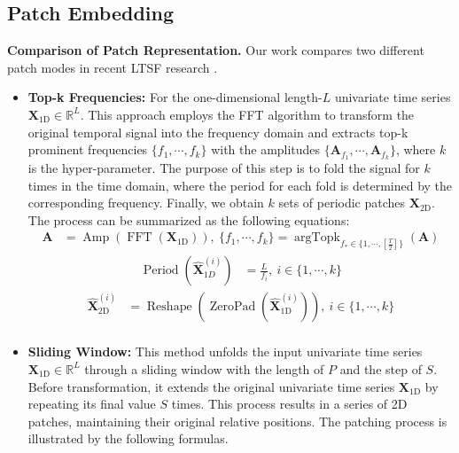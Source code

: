 \documentclass{article} \usepackage{iclr2024_conference,times}
\begin{document}
\subsection{Patch Embedding}

\noindent \textbf{Comparison of Patch Representation.} Our work compares two different patch modes in recent LTSF research \citep{timesnet, patchtst}. 

\noindent\begin{itemize}
\item{\textbf{Top-k Frequencies:}} For the one-dimensional length-$L$ univariate time series $\mathbf{X}_{\text{1D}} \in\mathbb{R}^{L}$. This approach employs the FFT algorithm to transform the original temporal signal into the frequency domain and extracts top-k prominent frequencies $\{f_{1},\cdots,f_{k}\}$ with the amplitudes $\{\mathbf{A}_{f_{1}},\cdots,\mathbf{A}_{f_{k}}\}$, where $k$ is the hyper-parameter. The purpose of this step is to fold the signal for $k$ times in the time domain, where the period for each fold is determined by the corresponding frequency. Finally, we obtain $k$ sets of periodic patches $\mathbf{X}_{\text{2D}}$. The process can be summarized as the following equations: 
\begin{equation}\label{equ:fft_for_period}
  \begin{split}
    \mathbf{A} & = \operatorname{Amp}(\operatorname{FFT}(\mathbf{X}_{\text{1D}})),\
    \{f_{1},\cdots,f_{k}\} = \mathop{\arg\mathrm{Topk}}_{f_{\ast}\in\{1,\cdots,[\frac{T}{2}]\}}\left(\mathbf{A}\right)
  \end{split}
\end{equation}
\begin{equation}\label{equ:period}
  \begin{split}
    \operatorname{Period}(\mathbf{\hat{X}}_{1D}^{(i)} ) &= \frac{L}{f_i},\ i\in
    \{1,\cdots, k\} 
  \end{split}
\end{equation}
\begin{equation}\label{equ:reshape}
  \begin{split}
\mathbf{\hat{X}}_{\text{2D}}^{(i)} &= \operatorname{Reshape}\left(\operatorname{ZeroPad}(\mathbf{\hat{X}}_{\text{1D}}^{(i)})\right),\ i\in\{1,\cdots, k\}\\
  \end{split}
\end{equation}

\item{\textbf{Sliding Window:}} This method unfolds the input univariate time series $\mathbf{X}_{\text{1D}} \in\mathbb{R}^{L}$ through a sliding window with the length of $P$ and the step of $S$. Before transformation, it extends the original univariate time series $\mathbf{X}_{\text{1D}}$ by repeating its final value $S$ times. This process results in a series of 2D patches, maintaining their original relative positions. The patching process is illustrated by the following formulas.




\end{itemize}
\end{document}
